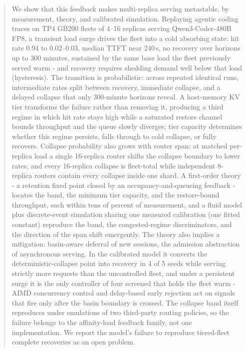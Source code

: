 \documentclass[letterpaper,twocolumn,10pt]{article}
\begin{document}
\begin{abstract}
We show that this feedback makes multi-replica serving metastable,
by measurement, theory, and calibrated simulation. Replaying agentic
coding traces on TP4 GB200 fleets of 4--16 replicas serving
Qwen3-Coder-480B FP8, a transient load surge drives the fleet into a
cold absorbing state: hit rate 0.94 to 0.02--0.03, median TTFT near
240\,s, no recovery over horizons up to 300 minutes, sustained by the
same base load the fleet previously served warm - and recovery
requires shedding demand well below that load (hysteresis). The
transition is probabilistic: across repeated identical runs,
intermediate rates split between recovery, immediate collapse, and a
delayed collapse that only 300-minute horizons reveal. A host-memory
KV tier transforms the failure rather than removing it, producing a
third regime in which hit rate stays high while a saturated restore
channel bounds throughput and the queue slowly diverges; tier
capacity determines whether this regime persists, falls through to
cold collapse, or fully recovers. Collapse probability also grows
with router span: at matched per-replica load a single 16-replica
router shifts the collapse boundary to lower rates, and every
16-replica collapse is fleet-total while independent 8-replica
routers contain every collapse inside one shard. A first-order
theory - a retention fixed point closed by an occupancy-and-queueing
feedback - locates the band, the minimum tier capacity, and the
restore-bound throughput, each within tens of percent of
measurement, and a fluid model plus discrete-event simulation
sharing one measured calibration (one fitted constant) reproduce the
band, the congested-regime discriminators, and the direction of the
span shift emergently. The theory also implies a mitigation:
basin-aware deferral of new sessions, the admission abstraction of
asynchronous serving. In the calibrated model it converts the
deterministic-collapse point into recovery in 4 of 5 seeds while
serving strictly more requests than the uncontrolled fleet, and
under a persistent surge it is the only controller of four screened
that holds the fleet warm - AIMD concurrency control and
delay-based early rejection act on signals that fire only after the
basin boundary is crossed. The collapse band itself reproduces
under emulations of two third-party routing policies, so the
failure belongs to the affinity-load feedback family, not one
implementation. We report the model's failure to reproduce
tiered-fleet complete recoveries as an open problem.
\end{abstract}
















\appendix

\end{document}
